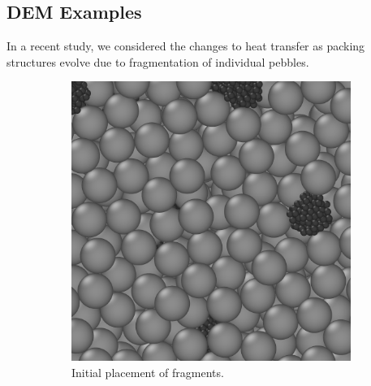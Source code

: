 \documentclass[11pt]{report} %
\begin{document}
\subsection{DEM Examples}
In a recent study, we considered the changes to heat transfer as packing structures evolve due to fragmentation of individual pebbles.



\begin{figure}[h]
        \centering
        \begin{subfigure}[t]{0.45\textwidth}
                \includegraphics[width=\textwidth]{images/crushed_initial}
                \caption{Initial placement of fragments.}
                \label{fig:crushed-initial}
        \end{subfigure}%
        ~
        \begin{subfigure}[t]{0.45\textwidth}

\end{subfigure}
\end{figure}
\end{document}
